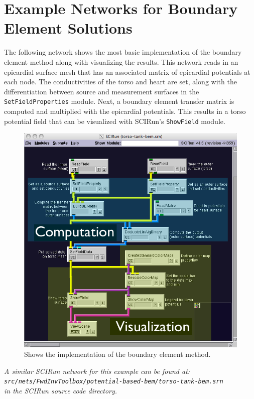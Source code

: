 \documentclass[fleqn,11pt,openany]{book}
\begin{document}
\section{Example Networks for Boundary Element Solutions}

The following network shows the most basic implementation of the boundary element method
along with visualizing the results. This network reads in an epicardial surface mesh that has an associated matrix of epicardial potentials at each node. The conductivities of the torso and heart
are set, along with the differentiation between source and measurement surfaces in the  {\tt SetFieldProperties} module. Next, a boundary element transfer matrix is computed and multiplied with the epicardial potentials. This results in a torso potential field that can be visualized with SCIRun's {\tt ShowField} module.

\begin{figure}[H]
\begin{center}
\includegraphics[width=\textwidth]{ECGToolkitGuide_figures/BEMnetwork.png}
\caption{Shows the implementation of the boundary element method.}
\label{BEMnet}
\end{center}
\end{figure}

\vspace{5pt}\textit{A similar SCIRun network for this example can be found at:\\{\tt src/nets/FwdInvToolbox/potential-based-bem/torso-tank-bem.srn}\\in the SCIRun source code directory.}\vspace{5pt}
\end{document}
